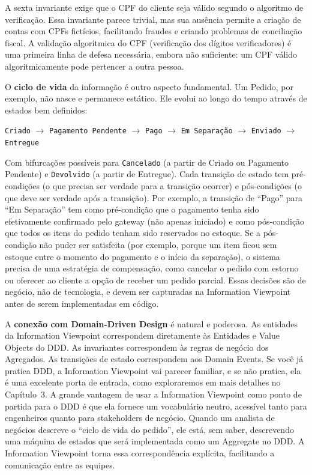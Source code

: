 A sexta invariante exige que o CPF do cliente seja válido segundo o algoritmo de
verificação. Essa invariante parece trivial, mas sua ausência permite a criação
de contas com CPFs fictícios, facilitando fraudes e criando problemas de
conciliação fiscal. A validação algorítmica do CPF (verificação dos dígitos
verificadores) é uma primeira linha de defesa necessária, embora não suficiente:
um CPF válido algoritmicamente pode pertencer a outra pessoa.

O \textbf{ciclo de vida} da informação é outro aspecto fundamental. Um Pedido,
por exemplo, não nasce e permanece estático. Ele evolui ao longo do tempo
através de estados bem definidos:

\begin{center}
\texttt{Criado} $\to$ \texttt{Pagamento Pendente} $\to$ \texttt{Pago} $\to$
\texttt{Em Separação} $\to$ \texttt{Enviado} $\to$ \texttt{Entregue}
\end{center}

Com bifurcações possíveis para \texttt{Cancelado} (a partir de Criado ou
Pagamento Pendente) e \texttt{Devolvido} (a partir de Entregue). Cada transição
de estado tem pré-condições (o que precisa ser verdade para a transição ocorrer)
e pós-condições (o que deve ser verdade após a transição). Por exemplo, a
transição de ``Pago'' para ``Em Separação'' tem como pré-condição que o pagamento
tenha sido efetivamente confirmado pelo gateway (não apenas iniciado) e como
pós-condição que todos os itens do pedido tenham sido reservados no estoque. Se
a pós-condição não puder ser satisfeita (por exemplo, porque um item ficou sem
estoque entre o momento do pagamento e o início da separação), o sistema precisa
de uma estratégia de compensação, como cancelar o pedido com estorno ou
oferecer ao cliente a opção de receber um pedido parcial. Essas decisões são de
negócio, não de tecnologia, e devem ser capturadas na Information Viewpoint antes
de serem implementadas em código.

A \textbf{conexão com Domain-Driven Design} é natural e poderosa. As entidades
da Information Viewpoint correspondem diretamente às Entidades e Value Objects do
DDD. As invariantes correspondem às regras de negócio dos Agregados. As transições
de estado correspondem aos Domain Events. Se você já pratica DDD, a Information
Viewpoint vai parecer familiar, e se não pratica, ela é uma excelente porta
de entrada, como exploraremos em mais detalhes no Capítulo~3. A grande vantagem
de usar a Information Viewpoint como ponto de partida para o DDD é que ela fornece
um vocabulário neutro, acessível tanto para engenheiros quanto para stakeholders de
negócio. Quando um analista de negócios descreve o ``ciclo de vida do pedido'', ele
está, sem saber, descrevendo uma máquina de estados que será implementada como um
Aggregate no DDD. A Information Viewpoint torna essa correspondência explícita,
facilitando a comunicação entre as equipes.

